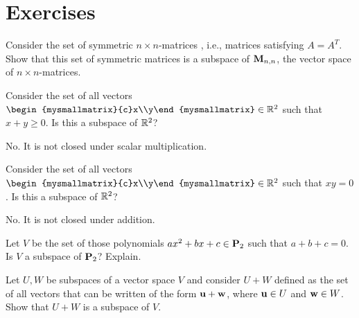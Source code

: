 \section*{Exercises}

\begin{ex}
  Consider the set of symmetric $n\times n$-matrices%
  , i.e., matrices satisfying $A=A^T$. Show
  that this set of symmetric matrices is a subspace of $\mathbf{M}_{n,n}$,
  the vector space of $n\times n$-matrices.
\end{ex}

\begin{ex}
  Consider the set of all vectors
  $\begin{mysmallmatrix}{c}x\\y\end{mysmallmatrix}\in\R^2$ such that
  $x+y\geq 0$. Is this a subspace of $\mathbb{R}^2$?
  \begin{sol}
    No. It is not closed under scalar multiplication.
  \end{sol}
\end{ex}

\begin{ex}
  Consider the set of all vectors
  $\begin{mysmallmatrix}{c}x\\y\end{mysmallmatrix}\in\R^2$ such that $xy=0$. Is
  this a subspace of $\mathbb{R}^2$?
  \begin{sol}
    No. It is not closed under addition.
  \end{sol}
\end{ex}

\begin{ex}
  Let $V$ be the set of those polynomials $ax^2+bx+c\in\mathbf{P}_2$ such
  that $a+b+c=0$. Is $V$ a subspace of $\mathbf{P}_2$? Explain.
\end{ex}

\begin{ex}
  Let $U,W$ be subspaces of a vector space $V$ and consider $U+W$
  defined as the set of all vectors that can be written of the form
  $\vect{u}+\vect{w}$, where $\vect{u}\in U$ and $\vect{w}\in W$. Show
  that $U+W$ is a subspace of $V$.
\end{ex}

